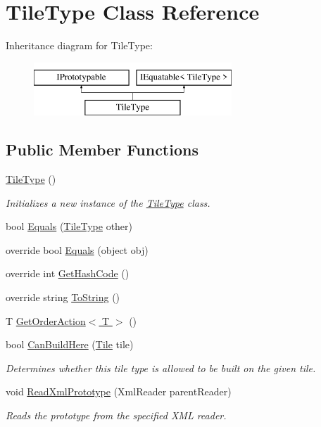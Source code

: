 \hypertarget{class_tile_type}{}\section{Tile\+Type Class Reference}
\label{class_tile_type}
Inheritance diagram for Tile\+Type\+:\begin{figure}[H]
\begin{center}
\leavevmode
\includegraphics[height=2.000000cm]{class_tile_type}
\end{center}
\end{figure}
\subsection*{Public Member Functions}
\begin{DoxyCompactItemize}
\item 
\hyperlink{class_tile_type_abbcdc00951e1510c63f38613c9d63f59}{Tile\+Type} ()
\begin{DoxyCompactList}\small\item\em Initializes a new instance of the \hyperlink{class_tile_type}{Tile\+Type} class. \end{DoxyCompactList}\item 
bool \hyperlink{class_tile_type_a64fc9bec84444700962a0e7658a205fa}{Equals} (\hyperlink{class_tile_type}{Tile\+Type} other)
\item 
override bool \hyperlink{class_tile_type_ac39e4bed164069c9dbb5ce5d630bf11a}{Equals} (object obj)
\item 
override int \hyperlink{class_tile_type_a29b7914ec11c89facbca91e69b8a2420}{Get\+Hash\+Code} ()
\item 
override string \hyperlink{class_tile_type_ab6b89688d93a7e3b1cb18be3bbbf0b82}{To\+String} ()
\item 
T \hyperlink{class_tile_type_a9385c11a23951c3fd8d357631be69b7e}{Get\+Order\+Action$<$ T $>$} ()
\item 
bool \hyperlink{class_tile_type_ac981ce0a7c419814bcafdafba670d117}{Can\+Build\+Here} (\hyperlink{class_tile}{Tile} tile)
\begin{DoxyCompactList}\small\item\em Determines whether this tile type is allowed to be built on the given tile. \end{DoxyCompactList}\item 
void \hyperlink{class_tile_type_ae39d2b8e69a19ad1aedcd8ad9ab19727}{Read\+Xml\+Prototype} (Xml\+Reader parent\+Reader)
\begin{DoxyCompactList}\small\item\em Reads the prototype from the specified X\+ML reader. \end{DoxyCompactList}\end{DoxyCompactItemize}

